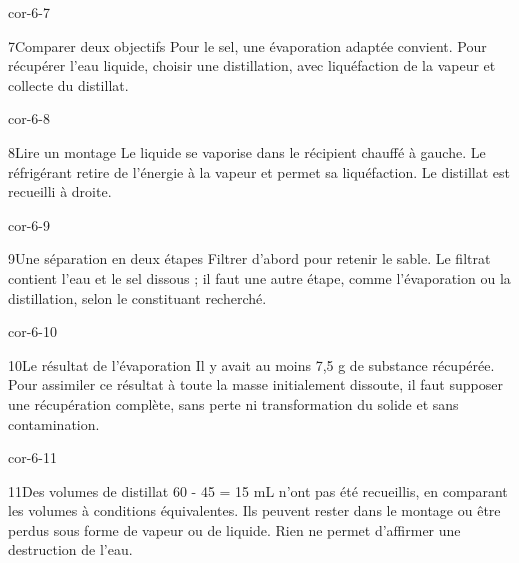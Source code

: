 \documentclass[12pt,twoside,openany]{book}
\begin{document}
\begin{blocLivre}{cor-6-7}
\begin{corrige}{7}{Comparer deux objectifs}
Pour le sel, une évaporation adaptée convient. Pour récupérer l’eau liquide, choisir une distillation, avec liquéfaction de la vapeur et collecte du distillat.\par
\end{corrige}\end{blocLivre}
\begin{blocLivre}{cor-6-8}
\begin{corrige}{8}{Lire un montage}
Le liquide se vaporise dans le récipient chauffé à gauche. Le réfrigérant retire de l’énergie à la vapeur et permet sa liquéfaction. Le distillat est recueilli à droite.\par
{}
\end{corrige}\end{blocLivre}
\begin{blocLivre}{cor-6-9}
\begin{corrige}{9}{Une séparation en deux étapes}
Filtrer d’abord pour retenir le sable. Le filtrat contient l’eau et le sel dissous ; il faut une autre étape, comme l’évaporation ou la distillation, selon le constituant recherché.\par
\end{corrige}\end{blocLivre}
\begin{blocLivre}{cor-6-10}
\begin{corrige}{10}{Le résultat de l’évaporation}
Il y avait au moins 7,5 g de substance récupérée. Pour assimiler ce résultat à toute la masse initialement dissoute, il faut supposer une récupération complète, sans perte ni transformation du solide et sans contamination.\par
\end{corrige}\end{blocLivre}
\begin{blocLivre}{cor-6-11}
\begin{corrige}{11}{Des volumes de distillat}
60 - 45 = 15 mL n’ont pas été recueillis, en comparant les volumes à conditions équivalentes. Ils peuvent rester dans le montage ou être perdus sous forme de vapeur ou de liquide. Rien ne permet d’affirmer une destruction de l’eau.\par
\end{corrige}\end{blocLivre}
\end{document}
